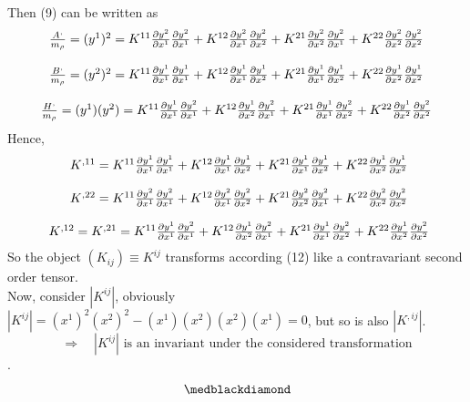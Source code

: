  Then (9) can be written as
 \begin {align}
\begin{array}{c}
\frac{A^,}{m_{\rho}} = (y^1)^2 =  K^{11}\pdv{y^2}{x^1} \pdv{y^2}{x^1}  +  K^{12}\pdv{y^2}{x^1}\pdv{y^2}{x^2} + K^{21}\pdv{y^2}{x^2}\pdv{y^2}{x^1} + K^{22}\pdv{y^2}{x^2}\pdv{y^2}{x^2}\\\\
\frac{B^,}{m_{\rho}} = (y^2)^2 =  K^{11}\pdv{y^1}{x^1} \pdv{y^1}{x^1}  +  K^{12}\pdv{y^1}{x^1}\pdv{y^1}{x^2} + K^{21}\pdv{y^1}{x^1}\pdv{y^1}{x^2} + K^{22}\pdv{y^1}{x^2}\pdv{y^1}{x^2}\\\\
\frac{H^,}{m_{\rho}} = (y^1)(y^2)  = K^{11}\pdv{y^1}{x^1} \pdv{y^2}{x^1}  +  K^{12}\pdv{y^1}{x^2}\pdv{y^2}{x^1} + K^{21}\pdv{y^1}{x^1}\pdv{y^2}{x^2} + K^{22}\pdv{y^1}{x^2}\pdv{y^2}{x^2}
  \end{array}
  \end{align}
  Hence,
  \begin{align}
\begin{array}{c}
  \ K^{,11}  =  K^{11}\pdv{y^1}{x^1} \pdv{y^1}{x^1}  +  K^{12}\pdv{y^1}{x^1}\pdv{y^1}{x^2} + K^{21}\pdv{y^1}{x^1}\pdv{y^1}{x^2} + K^{22}\pdv{y^1}{x^2}\pdv{y^1}{x^2}\\\\
\ K^{,22} =  K^{11}\pdv{y^2}{x^1} \pdv{y^2}{x^1}  +  K^{12}\pdv{y^2}{x^1}\pdv{y^2}{x^2} + K^{21}\pdv{y^2}{x^2}\pdv{y^2}{x^1} + K^{22}\pdv{y^2}{x^2}\pdv{y^2}{x^2}\\\\
 \ K^{,12} = K^{,21} = K^{11}\pdv{y^1}{x^1} \pdv{y^2}{x^1}  +  K^{12}\pdv{y^1}{x^2}\pdv{y^2}{x^1} + K^{21}\pdv{y^1}{x^1}\pdv{y^2}{x^2} + K^{22}\pdv{y^1}{x^2}\pdv{y^2}{x^2}
  \end{array}
\end{align}
So the object $(K_{ij})\equiv K^{ij}$ transforms according (12) like a contravariant second order tensor.\\

Now, consider $|K^{ij}|$, obviously $|K^{ij}| = (x^1)^2(x^2)^2-(x^1)(x^2)(x^2)(x^1) =0$, but so is also $|K^{,ij}|$.
$$\Rightarrow\quad |K^{ij}| \text{ is an invariant under the considered transformation}$$. 
$$\medblackdiamond$$
\pagebreak[4]


